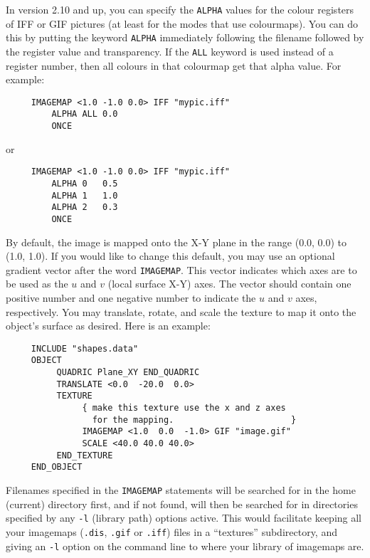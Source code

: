 In version 2.10 and up, you can specify the
{\tt ALPHA}
values for the
colour registers of IFF or GIF pictures (at
least for the modes that
use colourmaps).  You can do this by putting the keyword {\tt ALPHA}
immediately following the filename followed by the register value and
transparency.  If the
{\tt ALL} keyword
is used instead of a register number, then all colours in that
colourmap get that alpha value. For example:
\begin{verbatim}
     IMAGEMAP <1.0 -1.0 0.0> IFF "mypic.iff"
         ALPHA ALL 0.0
         ONCE
\end{verbatim}
or
\begin{verbatim}
     IMAGEMAP <1.0 -1.0 0.0> IFF "mypic.iff"
         ALPHA 0   0.5
         ALPHA 1   1.0
         ALPHA 2   0.3
         ONCE
\end{verbatim}
By default, the image is mapped onto the X-Y plane in the range (0.0,
0.0) to (1.0, 1.0).  If you would like to change this default, you may
use an optional gradient%
 {\tt <x y z>} vector after the word
{\tt IMAGEMAP}.  This vector indicates which axes are to be used as the $u$
and $v$ (local surface X-Y) axes.  The vector should contain one
positive number and one negative number to indicate the $u$ and $v$
axes, respectively.  You may
translate, rotate, and scale the texture
to map it onto the object's surface as desired.  Here is an example:
\begin{verbatim}
     INCLUDE "shapes.data"
     OBJECT
          QUADRIC Plane_XY END_QUADRIC
          TRANSLATE <0.0  -20.0  0.0>
          TEXTURE
               { make this texture use the x and z axes
                 for the mapping.                       }
               IMAGEMAP <1.0  0.0  -1.0> GIF "image.gif"
               SCALE <40.0 40.0 40.0>
          END_TEXTURE
     END_OBJECT
\end{verbatim}

Filenames
specified in the {\tt IMAGEMAP} statements will be searched
for in the home (current) directory first, and if not found, will then
be searched for in directories specified by any {\tt -l}
(library path) options active.  This would facilitate keeping all your
imagemaps ({\tt .dis}, {\tt .gif} or {\tt .iff}) files in a
``textures'' subdirectory, and giving an {\tt -l} option on the
command line to where your library of imagemaps are.

